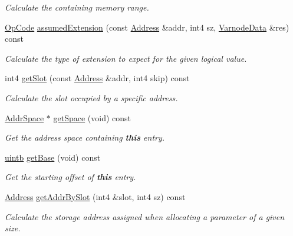 \begin{DoxyCompactItemize}
\begin{DoxyCompactList}\small\item\em Calculate the containing memory range. \end{DoxyCompactList}\item 
\mbox{\hyperlink{opcodes_8hh_abeb7dfb0e9e2b3114e240a405d046ea7}{Op\+Code}} \mbox{\hyperlink{class_param_entry_ae81b887aea24a253882ce6562d10a7a0}{assumed\+Extension}} (const \mbox{\hyperlink{class_address}{Address}} \&addr, int4 sz, \mbox{\hyperlink{struct_varnode_data}{Varnode\+Data}} \&res) const
\begin{DoxyCompactList}\small\item\em Calculate the type of {\itshape extension} to expect for the given logical value. \end{DoxyCompactList}\item 
int4 \mbox{\hyperlink{class_param_entry_af5f3ce2b0cce7b2400a14ab3abc37cd9}{get\+Slot}} (const \mbox{\hyperlink{class_address}{Address}} \&addr, int4 skip) const
\begin{DoxyCompactList}\small\item\em Calculate the {\itshape slot} occupied by a specific address. \end{DoxyCompactList}\item 
\mbox{\hyperlink{class_addr_space}{Addr\+Space}} $\ast$ \mbox{\hyperlink{class_param_entry_a498cd78bbe7fa439beeaf8243eed9177}{get\+Space}} (void) const
\begin{DoxyCompactList}\small\item\em Get the address space containing {\bfseries{this}} entry. \end{DoxyCompactList}\item 
\mbox{\hyperlink{types_8h_a2db313c5d32a12b01d26ac9b3bca178f}{uintb}} \mbox{\hyperlink{class_param_entry_addf545facfb18d6e4f4a0ae3aea203a8}{get\+Base}} (void) const
\begin{DoxyCompactList}\small\item\em Get the starting offset of {\bfseries{this}} entry. \end{DoxyCompactList}\item 
\mbox{\hyperlink{class_address}{Address}} \mbox{\hyperlink{class_param_entry_afa742398e87fda08bc9cfaa69304c4be}{get\+Addr\+By\+Slot}} (int4 \&slot, int4 sz) const
\begin{DoxyCompactList}\small\item\em Calculate the storage address assigned when allocating a parameter of a given size. \end{DoxyCompactList}\item 

\end{DoxyCompactItemize}
